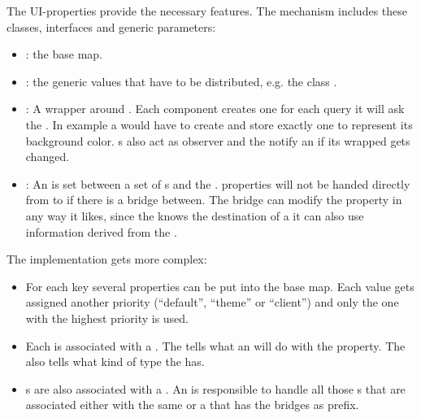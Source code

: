 The UI-properties provide the necessary features. The mechanism includes these classes, interfaces and generic parameters:
\begin{itemize}
	\item {}: the base map.
	\item {}: the generic values that have to be distributed, e.g. the class .
	\item {}: A wrapper around . Each component creates one  for each query it will ask the . In example a  would have to create and store exactly one  to represent its background color. s also act as observer and the  notify an  if its wrapped  gets changed.
	\item {}: An  is set between a set of s and the \linebreak {}.  properties will not be handed directly from \linebreak {} to  if there is a bridge between. The bridge can modify the  property in any way it likes, since the  knows the destination of a  it can also use information derived from the .
\end{itemize}

The implementation gets more complex:
\begin{itemize}
	\item For each key several  properties can be put into the base map. Each value gets assigned another priority (``default'', ``theme'' or ``client'') and only the one with the highest priority is used.
	\item Each  is associated with a . The  tells what an  will do with the  property. The  also tells what kind of type the  has.
	\item {}s are also associated with a . An  is responsible to handle all those s that are associated either with the same  or a  that has the bridges  as prefix.
\end{itemize}


